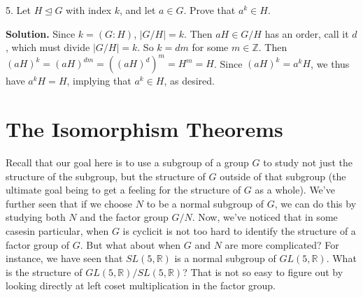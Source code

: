 \documentclass[10pt,]{book}
\theoremstyle{plain}
\theoremstyle{definition}
\theoremstyle{definition}
\theoremstyle{definition}
\theoremstyle{definition}
\numberwithin{equation}{section}
\def\Z{\mathbb{Z}}
\def\R{\mathbb{R}}
\begin{document}
\begin{exerciselist}
\begin{enumerate}[label=(\alph*)]
\end{enumerate}
%
\item[5.]\hypertarget{exercise-63}{}Let \(H\unlhd G\) with index \(k\), and let \(a\in G\). Prove that \(a^k\in H\).%
\par\smallskip
\par\smallskip
\noindent\textbf{Solution.}\hypertarget{solution-63}{}\quad
Since \(k=(G:H)\), \(|G/H|=k\).  Then \(aH\in G/H\) has an order, call it \(d\), which must divide \(|G/H|=k\). So \(k=dm\) for some \(m\in \Z\).  Then \((aH)^k=(aH)^{dm}=((aH)^d)^m=H^m=H\). Since \((aH)^k=a^kH\), we thus have \(a^kH=H\), implying that \(a^k\in H\), as desired.%
\end{exerciselist}
\typeout{************************************************}
\typeout{************************************************}
\chapter[{The Isomorphism Theorems}]{The Isomorphism Theorems}\label{isothms}
Recall that our goal here is to use a subgroup of a group \(G\) to study not just the structure of the subgroup, but the structure of \(G\) outside of that subgroup (the ultimate goal being to get a feeling for the structure of \(G\) as a whole). We've further seen that if we choose \(N\) to be a normal subgroup of \(G\), we can do this by studying both \(N\) and the factor group \(G/N\). Now, we've noticed that in some cases\textemdash{}in particular, when \(G\) is cyclic\textendash{}it is not too hard to identify the structure of a factor group of \(G\). But what about when \(G\) and \(N\) are more complicated? For instance, we have seen that \(SL(5,\R)\) is a normal subgroup of \(GL(5,\R)\). What is the structure of \(GL(5,\R)/SL(5,\R)\)? That is not so easy to figure out by looking directly at left coset multiplication in the factor group.%
\typeout{************************************************}
\typeout{************************************************}
\end{document}
